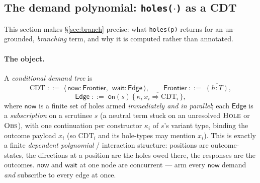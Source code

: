 \documentclass[11pt]{article}
\newcommand{\rul}[1]{\ensuremath{\textsc{#1}}}
\begin{document}
\subsection{The demand polynomial: \texttt{holes(\(\cdot\))} as a CDT}\label{sec:cdt}
This section makes \S\ref{sec:branch} precise: what
\lstinline[language=mettail,basicstyle=\ttfamily\small]|holes(p)| returns for an un-grounded,
\emph{branching} term, and why it is computed rather than annotated.

\paragraph{The object.} A \emph{conditional demand tree} is
\[
  \mathrm{CDT} \;::=\; \big\langle\, \mathsf{now}:\mathsf{Frontier},\ \ \mathsf{wait}:\overline{\mathsf{Edge}} \,\big\rangle,
  \qquad
  \mathsf{Frontier} \;::=\; \overline{(h:T)},
\]
\[
  \mathsf{Edge} \;::=\; \mathsf{on}(s)\,\{\, \overline{\kappa_i\,x_i \Rightarrow \mathrm{CDT}_i} \,\},
\]
where $\mathsf{now}$ is a finite set of holes armed \emph{immediately and in parallel}; each
$\mathsf{Edge}$ is a \emph{subscription} on a scrutinee $s$ (a neutral term stuck on an unresolved
$\rul{Hole}$ or $\rul{Obs}$), with one continuation per constructor $\kappa_i$ of $s$'s variant type,
binding the outcome payload $x_i$ (so $\mathrm{CDT}_i$ and its hole-types may mention $x_i$). This is
exactly a finite \emph{dependent polynomial} / interaction structure: positions are outcome-states,
the directions at a position are the holes owed there, the responses are the outcomes. $\mathsf{now}$
and $\mathsf{wait}$ at one node are concurrent --- arm every $\mathsf{now}$ demand \emph{and}
subscribe to every edge at once.
\end{document}
